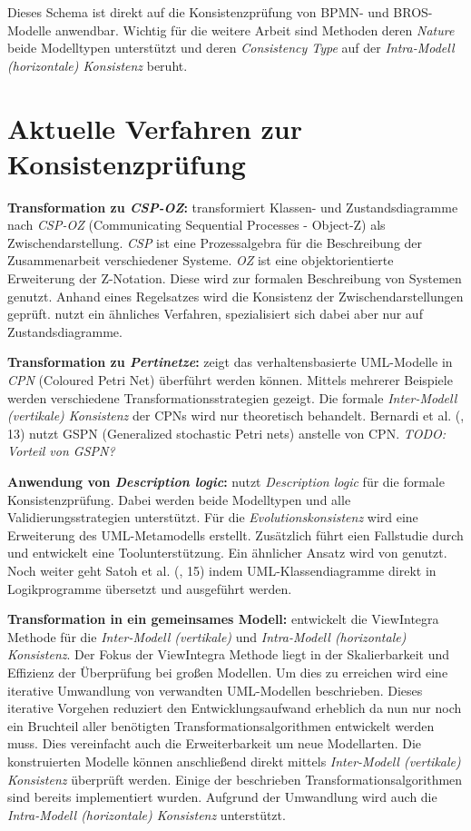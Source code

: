 Dieses Schema ist direkt auf die Konsistenzprüfung von BPMN- und BROS-Modelle anwendbar.
Wichtig für die weitere Arbeit sind Methoden deren \emph{Nature} beide Modelltypen unterstützt und deren \emph{Consistency Type} auf der \emph{Intra-Modell (horizontale) Konsistenz} beruht.

\section{Aktuelle Verfahren zur Konsistenzprüfung}

\textbf{Transformation zu \emph{CSP-OZ}:}
\cite{Rasch2003} transformiert Klassen- und Zustandsdiagramme nach \emph{CSP-OZ} (Communicating Sequential Processes - Object-Z) als Zwischendarstellung.
\emph{CSP} ist eine Prozessalgebra für die Beschreibung der Zusammenarbeit verschiedener Systeme. 
\emph{OZ} ist eine objektorientierte Erweiterung der Z-Notation. Diese wird zur formalen Beschreibung von Systemen genutzt.
Anhand eines Regelsatzes wird die Konsistenz der Zwischendarstellungen geprüft.
\cite{Kim2004} nutzt ein ähnliches Verfahren, spezialisiert sich dabei aber nur auf Zustandsdiagramme.

\textbf{Transformation zu \emph{Pertinetze}:}
\cite{Shinkawa2006} zeigt das verhaltensbasierte UML-Modelle in \emph{CPN} (Coloured Petri Net) überführt werden können.
Mittels mehrerer Beispiele werden verschiedene Transformationsstrategien gezeigt.
Die formale \emph{Inter-Modell (vertikale) Konsistenz} der CPNs wird nur theoretisch behandelt.
Bernardi et al. (\cite{Usman2008}, 13) nutzt GSPN (Generalized stochastic Petri nets) anstelle von CPN. \textit{TODO: Vorteil von GSPN?}

\textbf{Anwendung von \emph{Description logic}:}
\cite{Mens2005} nutzt \emph{Description logic} für die formale Konsistenzprüfung.
Dabei werden beide Modelltypen und alle Validierungsstrategien unterstützt.
Für die \emph{Evolutionskonsistenz} wird eine Erweiterung des UML-Metamodells erstellt.
Zusätzlich führt \cite{Mens2005} eien Fallstudie durch und entwickelt eine Toolunterstützung.
Ein ähnlicher Ansatz wird von \cite{Simmonds2004} genutzt.
Noch weiter geht Satoh et al. (\cite{Usman2008}, 15) indem UML-Klassendiagramme direkt in Logikprogramme übersetzt und ausgeführt werden.

\textbf{Transformation in ein gemeinsames Modell:}
\cite{Egyed2001} entwickelt die ViewIntegra Methode für die  \emph{Inter-Modell (vertikale)} und \emph{Intra-Modell (horizontale) Konsistenz}.
Der Fokus der ViewIntegra Methode liegt in der Skalierbarkeit und Effizienz der Überprüfung bei großen Modellen.
Um dies zu erreichen wird eine iterative Umwandlung von verwandten UML-Modellen beschrieben.
Dieses iterative Vorgehen reduziert den Entwicklungsaufwand erheblich da nun nur noch ein Bruchteil aller benötigten Transformationsalgorithmen entwickelt werden muss.
Dies vereinfacht auch die Erweiterbarkeit um neue Modellarten.
Die konstruierten Modelle können anschließend direkt mittels \emph{Inter-Modell (vertikale) Konsistenz} überprüft werden.
Einige der beschrieben Transformationsalgorithmen sind bereits implementiert wurden.
Aufgrund der Umwandlung wird auch die \emph{Intra-Modell (horizontale) Konsistenz} unterstützt.

